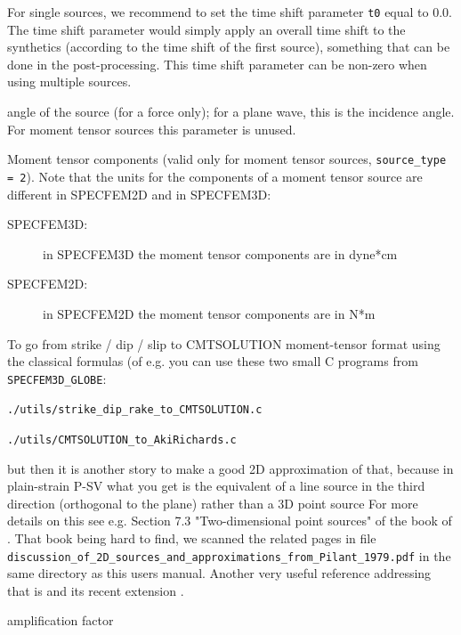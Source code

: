 \begin{description}[font=\ttfamily]
\item[t0] For single sources, we recommend to set the time shift parameter \texttt{t0} equal to $0.0$.
The time shift parameter would simply apply
an overall time shift to the synthetics (according to the time shift of the first source), something that can be done
in the post-processing. This time shift parameter can be non-zero when using multiple sources.

\item[anglesource] angle of the source (for a force only); for a plane wave, this is the incidence angle. For moment tensor sources this parameter is unused.

\item[Mxx,Mzz,Mxz] Moment tensor components (valid only for moment tensor sources, \texttt{source\_type = 2}).
Note that the units for the components of a moment tensor source are different in SPECFEM2D and in SPECFEM3D:
%
\begin{description}
\item[SPECFEM3D:] in SPECFEM3D the moment tensor components are in dyne*cm
\item[SPECFEM2D:] in SPECFEM2D the moment tensor components are in N*m
\end{description}

To go from strike / dip / slip to CMTSOLUTION moment-tensor format using the classical formulas (of e.g. \cite{AkRi80} you can use these two small C programs from \texttt{SPECFEM3D\_GLOBE}:

\texttt{./utils/strike\_dip\_rake\_to\_CMTSOLUTION.c}

\texttt{./utils/CMTSOLUTION\_to\_AkiRichards.c}

but then it is another story to make a good 2D approximation of that, because in plain-strain P-SV what you get is the equivalent of a line source in the third direction (orthogonal to the plane) rather than a 3D point source
For more details on this see e.g. Section 7.3 "Two-dimensional point sources" of the book of \cite{Pil79}. That book being hard to find, we scanned the related pages in file\\
\texttt{discussion\_of\_2D\_sources\_and\_approximations\_from\_Pilant\_1979.pdf} in the same directory as this users manual.
Another very useful reference addressing that is \cite{HeVi88} and its recent extension \citep{LiHeClSu14}.

\item[factor] amplification factor

\end{description}

